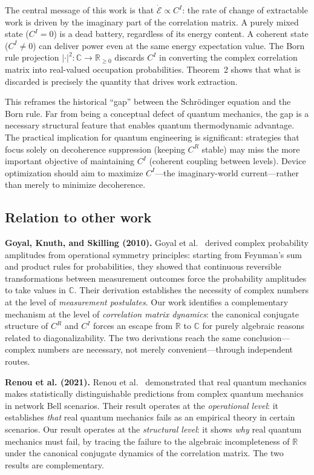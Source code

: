 \documentclass[aps,pra,preprint,groupedaddress,amsmath,amssymb,floatfix]{revtex4-2}
\begin{document}
The central message of this work is that $\dot{\mathcal{E}} \propto C^I$: the rate of change of extractable work is driven by the imaginary part of the correlation matrix. A purely mixed state ($C^I = 0$) is a dead battery, regardless of its energy content. A coherent state ($C^I \neq 0$) can deliver power even at the same energy expectation value. The Born rule projection $|\cdot|^2 : \mathbb{C} \to \mathbb{R}_{\ge 0}$ discards $C^I$ in converting the complex correlation matrix into real-valued occupation probabilities. Theorem~2 shows that what is discarded is precisely the quantity that drives work extraction.

This reframes the historical ``gap'' between the Schr\"odinger equation and the Born rule. Far from being a conceptual defect of quantum mechanics, the gap is a necessary structural feature that enables quantum thermodynamic advantage. The practical implication for quantum engineering is significant: strategies that focus solely on decoherence suppression (keeping $C^R$ stable) may miss the more important objective of maintaining $C^I$ (coherent coupling between levels). Device optimization should aim to maximize $C^I$---the imaginary-world current---rather than merely to minimize decoherence.

\subsection{Relation to other work}

\textbf{Goyal, Knuth, and Skilling (2010).} Goyal et al.~\cite{goyal2010} derived complex probability amplitudes from operational symmetry principles: starting from Feynman's sum and product rules for probabilities, they showed that continuous reversible transformations between measurement outcomes force the probability amplitudes to take values in $\mathbb{C}$. Their derivation establishes the necessity of complex numbers at the level of \textit{measurement postulates}. Our work identifies a complementary mechanism at the level of \textit{correlation matrix dynamics}: the canonical conjugate structure of $C^R$ and $C^I$ forces an escape from $\mathbb{R}$ to $\mathbb{C}$ for purely algebraic reasons related to diagonalizability. The two derivations reach the same conclusion---complex numbers are necessary, not merely convenient---through independent routes.

\textbf{Renou et al. (2021).} Renou et al.~\cite{renou2021} demonstrated that real quantum mechanics makes statistically distinguishable predictions from complex quantum mechanics in network Bell scenarios. Their result operates at the \textit{operational level}: it establishes \textit{that} real quantum mechanics fails as an empirical theory in certain scenarios. Our result operates at the \textit{structural level}: it shows \textit{why} real quantum mechanics must fail, by tracing the failure to the algebraic incompleteness of $\mathbb{R}$ under the canonical conjugate dynamics of the correlation matrix. The two results are complementary.
\end{document}
